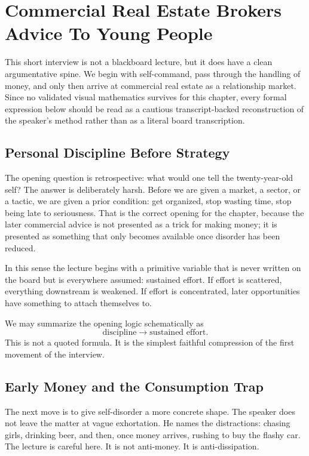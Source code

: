 \chapter{Commercial Real Estate Brokers Advice To Young People}

This short interview is not a blackboard lecture, but it does have a clean argumentative spine. We begin with self-command, pass through the handling of money, and only then arrive at commercial real estate as a relationship market. Since no validated visual mathematics survives for this chapter, every formal expression below should be read as a cautious transcript-backed reconstruction of the speaker's method rather than as a literal board transcription.

\section{Personal Discipline Before Strategy}

The opening question is retrospective: what would one tell the twenty-year-old self? The answer is deliberately harsh. Before we are given a market, a sector, or a tactic, we are given a prior condition: get organized, stop wasting time, stop being late to seriousness. That is the correct opening for the chapter, because the later commercial advice is not presented as a trick for making money; it is presented as something that only becomes available once disorder has been reduced.

In this sense the lecture begins with a primitive variable that is never written on the board but is everywhere assumed: sustained effort. If effort is scattered, everything downstream is weakened. If effort is concentrated, later opportunities have something to attach themselves to.

We may summarize the opening logic schematically as
\begin{equation}
\text{discipline} \to \text{sustained effort}.
\end{equation}
This is not a quoted formula. It is the simplest faithful compression of the first movement of the interview.

\section{Early Money and the Consumption Trap}

The next move is to give self-disorder a more concrete shape. The speaker does not leave the matter at vague exhortation. He names the distractions: chasing girls, drinking beer, and then, once money arrives, rushing to buy the flashy car. The lecture is careful here. It is not anti-money. It is anti-dissipation.

